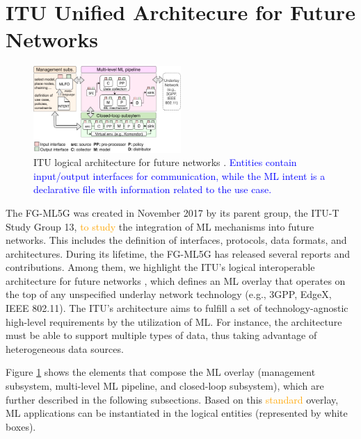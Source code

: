 \documentclass[journal]{IEEEtran}
\begin{document}

\section{ITU Unified Architecure for Future Networks}
\label{section:itu_architecture}

\begin{figure}[!ht]
	\centering
	\includegraphics[width=0.5\textwidth]{itu_ml_architecture}
	\caption{ITU logical architecture for future networks \cite{itu2019architecture}. \textcolor{blue}{Entities contain input/output interfaces for communication, while the ML intent is a declarative file with information related to the use case.}}
	\label{fig:itu_ml_architecture}
\end{figure}

The FG-ML5G was created in November 2017 by its parent group, the ITU-T Study Group 13, \textcolor{orange}{to study} the integration of ML mechanisms into future networks. This includes the definition of interfaces, protocols, data formats, and architectures. During its lifetime, the FG-ML5G has released several reports and contributions. Among them, we highlight the ITU's logical interoperable architecture for future networks \cite{itu2019architecture}, which defines an ML overlay that operates on the top of any unspecified underlay network technology (e.g., 3GPP, EdgeX, IEEE 802.11). The ITU's architecture aims to fulfill a set of technology-agnostic high-level requirements by the utilization of ML. For instance, the architecture must be able to support multiple types of data, thus taking advantage of heterogeneous data sources. 

Figure \ref{fig:itu_ml_architecture} shows the elements that compose the ML overlay (management subsystem, multi-level ML pipeline, and closed-loop subsystem), which are further described in the following subsections. Based on this \textcolor{orange}{standard} overlay, ML applications can be instantiated in the logical entities (represented by white boxes).
\end{document}
